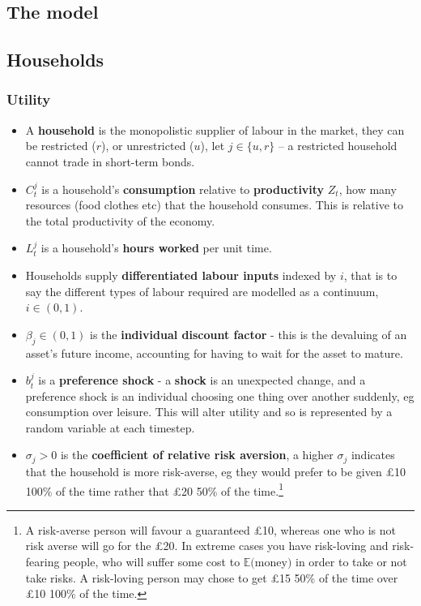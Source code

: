 \documentclass[notitlepage,12pt]{report}
\begin{document}
\begin{appendices}
	\section{The model}
	
	\subsection{Households}
	
	\subsubsection{Utility}
	
	\begin{itemize}
		\item A {\bf household} is the monopolistic supplier of labour in the market, they can be restricted (\(r\)), or unrestricted (\(u\)), let \(j\in\{u,r\}\) -- a restricted household cannot trade in short-term bonds.
		\item\(C_t^j\) is a household's {\bf consumption} relative to {\bf productivity} \(Z_t\), how many resources (food clothes etc) that the household consumes. This is relative to the total productivity of the economy.
		\item \(L_t^j\) is a household's {\bf hours worked} per unit time.
		\item Households supply {\bf differentiated labour inputs} indexed by \(i\), that is to say the different types of labour required are modelled as a continuum, \(i\in(0,1)\).
		\item \(\beta_j\in(0,1)\) is the {\bf individual discount factor} - this is the devaluing of an asset's future income, accounting for having to wait for the asset to mature.
		\item \(b_t^j\) is a {\bf preference shock} - a {\bf shock} is an unexpected change, and a preference shock is an individual choosing one thing over another suddenly, eg consumption over leisure. This will alter utility and so is represented by a random variable at each timestep.
		\item \(\sigma_j>0\) is the {\bf coefficient of relative risk aversion}, a higher \(\sigma_j\) indicates that the household is more risk-averse, eg they would prefer to be given \pounds10 100\% of the time rather that \pounds20 50\% of the time.\footnote{A risk-averse person will favour a guaranteed \pounds10, whereas one who is not risk averse will go for the \pounds20. In extreme cases you have risk-loving and risk-fearing people, who will suffer some cost to \(\mathbb{E}(\)money\()\) in order to take or not take risks. A risk-loving person may chose to get \pounds15 50\% of the time over \pounds10 100\% of the time.}

\end{itemize}
\end{appendices}
\end{document}
